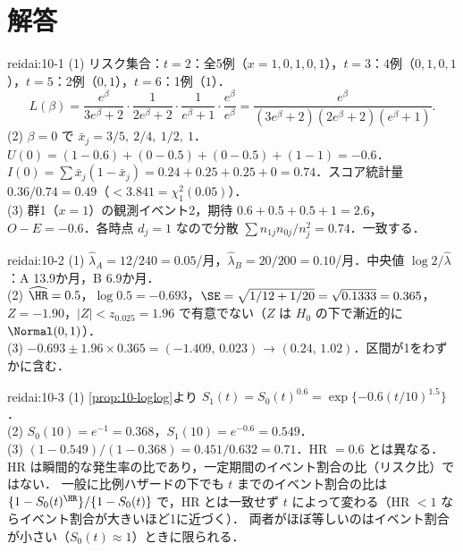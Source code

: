 \section{解答}\label{sec:10-sol}
\begin{kaitou}{reidai:10-1}
(1) リスク集合：$t=2$：全5例（$x=1,0,1,0,1$），$t=3$：4例（$0,1,0,1$），$t=5$：2例（$0,1$），$t=6$：1例（$1$）．
\[
L(\beta)=\frac{e^\beta}{3e^\beta+2}\cdot\frac{1}{2e^\beta+2}\cdot\frac{1}{e^\beta+1}\cdot\frac{e^\beta}{e^\beta}
=\frac{e^\beta}{(3e^\beta+2)(2e^\beta+2)(e^\beta+1)}.
\]
(2) $\beta=0$ で $\bar x_j=3/5,\ 2/4,\ 1/2,\ 1$．$U(0)=(1-0.6)+(0-0.5)+(0-0.5)+(1-1)=-0.6$．
$I(0)=\sum\bar x_j(1-\bar x_j)=0.24+0.25+0.25+0=0.74$．スコア統計量 $0.36/0.74=0.49$（$<3.841=\chi^2_1(0.05)$）．\\
(3) 群1（$x=1$）の観測イベント2，期待 $0.6+0.5+0.5+1=2.6$，$O-E=-0.6$．各時点 $d_j=1$ なので分散 $\sum n_{1j}n_{0j}/n_j^2=0.74$．一致する．
\end{kaitou}

\begin{kaitou}{reidai:10-2}
(1) $\hat\lambda_A=12/240=0.05$/月，$\hat\lambda_B=20/200=0.10$/月．中央値 $\log2/\hat\lambda$：A 13.9か月，B 6.9か月．\\
(2) $\widehat{\HR}=0.5$，$\log0.5=-0.693$，$\SE=\sqrt{1/12+1/20}=\sqrt{0.1333}=0.365$，$Z=-1.90$，$|Z|<z_{0.025}=1.96$ で有意でない（$Z$ は $H_0$ の下で漸近的に $\Normal(0,1)$）．\\
(3) $-0.693\pm1.96\times0.365=(-1.409,\,0.023)$ → $(0.24,\,1.02)$．区間が1をわずかに含む．
\end{kaitou}

\begin{kaitou}{reidai:10-3}
(1) \cref{prop:10-loglog}より $S_1(t)=S_0(t)^{0.6}=\exp\{-0.6(t/10)^{1.5}\}$．\\
(2) $S_0(10)=e^{-1}=0.368$，$S_1(10)=e^{-0.6}=0.549$．\\
(3) $(1-0.549)/(1-0.368)=0.451/0.632=0.71$．HR $=0.6$ とは異なる．HR は瞬間的な発生率の比であり，一定期間のイベント割合の比（リスク比）ではない．
一般に比例ハザードの下でも $t$ までのイベント割合の比は $\{1-S_0(t)^{\HR}\}/\{1-S_0(t)\}$ で，HR とは一致せず $t$ によって変わる（HR $<1$ ならイベント割合が大きいほど1に近づく）．
両者がほぼ等しいのはイベント割合が小さい（$S_0(t)\approx1$）ときに限られる．
\end{kaitou}

